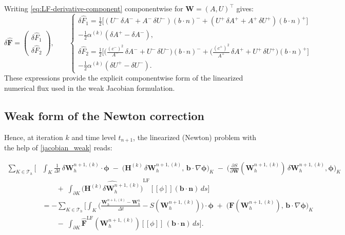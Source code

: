 \documentclass[11pt]{article}
\newcommand{\jump}[1]{\left[\!\left[#1\right]\!\right]}
\newcommand{\Th}{\mathcal{T}_h}
\begin{document}
Writing \eqref{eq:LF-derivative-component} componentwise for
$\mathbf{W}=(A,U)^{\!\top}$ gives:
\[
\delta\widehat{\mathbf{F}}
=
\begin{pmatrix}
\delta\widehat{F}_1\\[1mm]
\delta\widehat{F}_2
\end{pmatrix},
\qquad
\begin{cases}
\displaystyle
\delta\widehat{F}_1
=
\tfrac{1}{2}\Big[
  (U^-\,\delta A^- + A^-\,\delta U^-)(b \cdot n)^{-}
  + (U^+\,\delta A^+ + A^+\,\delta U^+)(b \cdot n)^{+}
\Big] \\
-\tfrac{1}{2}\alpha^{(k)}(\delta A^+ - \delta A^-),\\[3mm]
\displaystyle
\delta\widehat{F}_2
=
\tfrac{1}{2}\Big[
  \Big(\tfrac{(c^-)^2}{A^-}\,\delta A^- + U^-\,\delta U^-\Big)(b \cdot n)^{-}
  + \Big(\tfrac{(c^+)^2}{A^+}\,\delta A^+ + U^+\,\delta U^+\Big)(b \cdot n)^{+}
\Big] \\
-\tfrac{1}{2}\alpha^{(k)}(\delta U^+ - \delta U^-).
\end{cases}
\]
These expressions provide the explicit componentwise form of the
linearized numerical flux used in the weak Jacobian formulation.

\subsection*{Weak form of the Newton correction}

Hence, at iteration $k$ and time level $t_{n+1}$, the linearized (Newton) problem with the help  of \eqref{jacobian_weak} reads:

\begin{equation}\label{eq:newton-weak-final}
\boxed{
\begin{aligned}
\sum_{K\in\Th}
\Big[
  &\int_K
    \frac{1}{\Delta t}\,
    \delta\mathbf{W}_h^{n+1,(k)}\!\cdot\!\bm\phi
    \;-\;
    \big(\mathbf{H}^{(k)}\,\delta\mathbf{W}_h^{n+1,(k)},\,\bm b\!\cdot\!\nabla\bm\phi\big)_K
    \;-\;
    \Big(
      \frac{\partial S}{\partial\mathbf{W}}(\mathbf{W}_h^{n+1,(k)})\,\delta\mathbf{W}_h^{n+1,(k)},
      \bm\phi
    \Big)_K  \\[2mm]
  &\qquad
  +\;
  \int_{\partial K}
    \widehat{\big(\mathbf{H}^{(k)}\delta\mathbf{W}_h^{n+1,(k)}\big)}^{\mathrm{LF}}
    \!\!\jump{\phi}(\bm b\!\cdot\!\bm n)\,ds
\Big]
\\[2mm]
&= -\!
\sum_{K\in\Th}
\Big[
  \int_K
  \Big(
    \frac{\mathbf{W}_h^{n+1,(k)}-\mathbf{W}_h^n}{\Delta t}
    - S(\mathbf{W}_h^{n+1,(k)})
  \Big)\!\cdot\!\bm\phi
  \;+\;
  \big(\mathbf{F}(\mathbf{W}_h^{n+1,(k)}),\,\bm b\!\cdot\!\nabla\bm\phi\big)_K  \\[2mm]
  &\qquad
  -\;
  \int_{\partial K}
    \widehat{\mathbf{F}}^{\mathrm{LF}}(\mathbf{W}_h^{n+1,(k)})\! \jump{\phi} \,(\bm b\!\cdot\!\bm n)\,ds
\Big].
\end{aligned}}
\end{equation}
\end{document}
